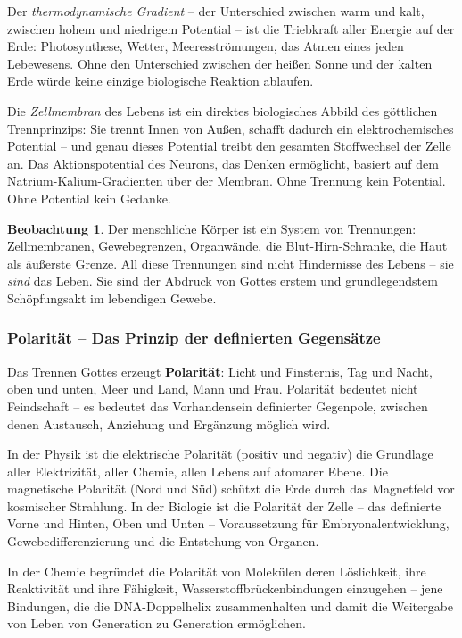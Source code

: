 ﻿\documentclass[a4paper,12pt]{article}
\theoremstyle{definition}
\newtheorem{observation}{Beobachtung}[section]
\begin{document}
Der \textit{thermodynamische Gradient} -- der Unterschied zwischen warm und kalt,
zwischen hohem und niedrigem Potential -- ist die Triebkraft aller Energie auf
der Erde: Photosynthese, Wetter, Meeresströmungen, das Atmen eines jeden Lebewesens.
Ohne den Unterschied zwischen der heißen Sonne und der kalten Erde würde keine
einzige biologische Reaktion ablaufen.

Die \textit{Zellmembran} des Lebens ist ein direktes biologisches Abbild des
göttlichen Trennprinzips: Sie trennt Innen von Außen, schafft dadurch ein
elektrochemisches Potential -- und genau dieses Potential treibt den gesamten
Stoffwechsel der Zelle an. Das Aktionspotential des Neurons, das Denken ermöglicht,
basiert auf dem Natrium-Kalium-Gradienten über der Membran. Ohne Trennung kein
Potential. Ohne Potential kein Gedanke.

\begin{observation}
	Der menschliche Körper ist ein System von Trennungen: Zellmembranen, Gewebegrenzen,
	Organ\-wände, die Blut-Hirn-Schranke, die Haut als äußerste Grenze. All diese
	Trennungen sind nicht Hindernisse des Lebens -- sie \textit{sind} das Leben.
	Sie sind der Abdruck von Gottes erstem und grundlegendstem Schöpfungsakt im
	lebendigen Gewebe.
\end{observation}

\subsubsection{Polarität -- Das Prinzip der definierten Gegensätze}

Das Trennen Gottes erzeugt \textbf{Polarität}: Licht und Finsternis, Tag und
Nacht, oben und unten, Meer und Land, Mann und Frau. Polarität bedeutet nicht
Feindschaft -- es bedeutet das Vorhandensein definierter Gegenpole, zwischen
denen Austausch, Anziehung und Ergänzung möglich wird.

In der Physik ist die elektrische Polarität (positiv und negativ) die Grundlage
aller Elektrizität, aller Chemie, allen Lebens auf atomarer Ebene. Die magnetische
Polarität (Nord und Süd) schützt die Erde durch das Magnetfeld vor kosmischer
Strahlung. In der Biologie ist die Polarität der Zelle -- das definierte Vorne
und Hinten, Oben und Unten -- Voraussetzung für Embryonalentwicklung, Gewebedifferenzierung
und die Entstehung von Organen.

In der Chemie begründet die Polarität von Molekülen deren Löslichkeit, ihre
Reaktivität und ihre Fähigkeit, Wasserstoffbrückenbindungen einzugehen -- jene
Bindungen, die die DNA-Doppelhelix zusammenhalten und damit die Weitergabe von
Leben von Generation zu Generation ermöglichen.
\end{document}
